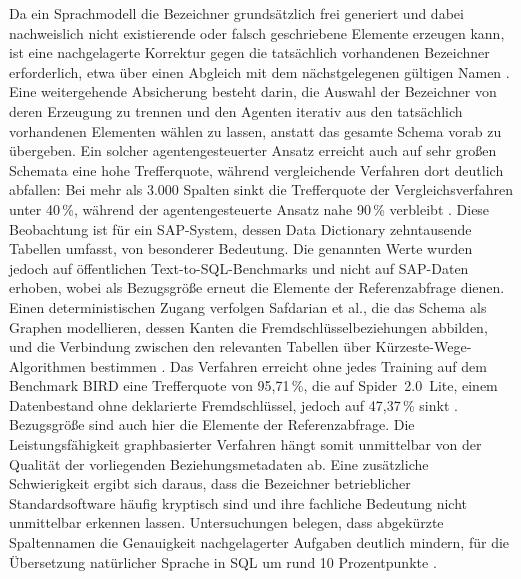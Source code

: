 Da ein Sprachmodell die Bezeichner grundsätzlich frei generiert und dabei nachweislich nicht existierende oder falsch geschriebene Elemente erzeugen kann, ist eine nachgelagerte Korrektur gegen die tatsächlich vorhandenen Bezeichner erforderlich, etwa über einen Abgleich mit dem nächstgelegenen gültigen Namen \cite{katsogiannis-meimarakis_-depth_2026}. Eine weitergehende Absicherung besteht darin, die Auswahl der Bezeichner von deren Erzeugung zu trennen und den Agenten iterativ aus den tatsächlich vorhandenen Elementen wählen zu lassen, anstatt das gesamte Schema vorab zu übergeben. Ein solcher agentengesteuerter Ansatz erreicht auch auf sehr großen Schemata eine hohe Trefferquote, während vergleichende Verfahren dort deutlich abfallen: Bei mehr als 3.000 Spalten sinkt die Trefferquote der Vergleichsverfahren unter 40\,\%, während der agentengesteuerte Ansatz nahe 90\,\% verbleibt \cite{wang_autolink_2026}. Diese Beobachtung ist für ein SAP-System, dessen Data Dictionary zehntausende Tabellen umfasst, von besonderer Bedeutung. %
Die genannten Werte wurden jedoch auf öffentlichen Text-to-SQL-Benchmarks und nicht auf SAP-Daten erhoben, wobei als Bezugsgröße erneut die Elemente der Referenzabfrage dienen. %
Einen deterministischen Zugang verfolgen Safdarian et al., die das Schema als Graphen modellieren, dessen Kanten die Fremdschlüsselbeziehungen abbilden, und die Verbindung zwischen den relevanten Tabellen über Kürzeste-Wege-Algorithmen bestimmen \cite{safdarian_schemagraphsql_2026}. Das Verfahren erreicht ohne jedes Training auf dem Benchmark BIRD eine Trefferquote von 95,71\,\%, die auf Spider~2.0~Lite, einem Datenbestand ohne deklarierte Fremdschlüssel, jedoch auf 47,37\,\% sinkt \cite{safdarian_schemagraphsql_2026}. Bezugsgröße sind auch hier die Elemente der Referenzabfrage. %
Die Leistungsfähigkeit graphbasierter Verfahren hängt somit unmittelbar von der Qualität der vorliegenden Beziehungsmetadaten ab.
Eine zusätzliche Schwierigkeit ergibt sich daraus, dass die Bezeichner betrieblicher Standardsoftware häufig kryptisch sind und ihre fachliche Bedeutung nicht unmittelbar erkennen lassen. Untersuchungen belegen, dass abgekürzte Spaltennamen die Genauigkeit nachgelagerter Aufgaben deutlich mindern, für die Übersetzung natürlicher Sprache in SQL um rund 10 Prozentpunkte \cite{cai_columbo_2025}. %
